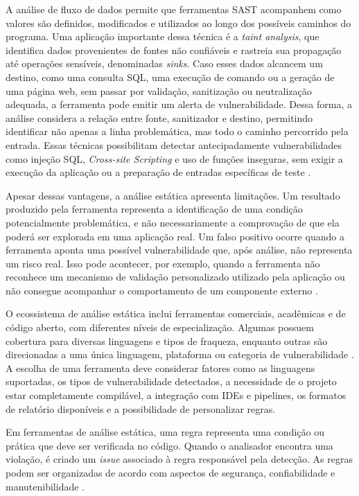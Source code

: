 A análise de fluxo de dados permite que ferramentas SAST acompanhem como valores são definidos, modificados e utilizados ao longo dos possíveis caminhos do programa. Uma aplicação importante dessa técnica é a \textit{taint analysis}, que identifica dados provenientes de fontes não confiáveis e rastreia sua propagação até operações sensíveis, denominadas \textit{sinks}. Caso esses dados alcancem um destino, como uma consulta SQL, uma execução de comando ou a geração de uma página web, sem passar por validação, sanitização ou neutralização adequada, a ferramenta pode emitir um alerta de vulnerabilidade. Dessa forma, a análise considera a relação entre fonte, sanitizador e destino, permitindo identificar não apenas a linha problemática, mas todo o caminho percorrido pela entrada. Essas técnicas possibilitam detectar antecipadamente vulnerabilidades como injeção SQL, \textit{Cross-site Scripting} e uso de funções inseguras, sem exigir a execução da aplicação ou a preparação de entradas específicas de teste \cite{noauthor_static_nodate}.

Apesar dessas vantagens, a análise estática apresenta limitações. Um resultado produzido pela ferramenta representa a identificação de uma condição potencialmente problemática, e não necessariamente a comprovação de que ela poderá ser explorada em uma aplicação real. Um falso positivo ocorre quando a ferramenta aponta uma possível vulnerabilidade que, após análise, não representa um risco real. Isso pode acontecer, por exemplo, quando a ferramenta não reconhece um mecanismo de validação personalizado utilizado pela aplicação ou não consegue acompanhar o comportamento de um componente externo \cite{iranmanesh_zerofalse_2025}.

O ecossistema de análise estática inclui ferramentas comerciais, acadêmicas e de código aberto, com diferentes níveis de especialização. Algumas possuem cobertura para diversas linguagens e tipos de fraqueza, enquanto outras são direcionadas a uma única linguagem, plataforma ou categoria de vulnerabilidade \cite{nist_source_code_security_analyzers_2021}. A escolha de uma ferramenta deve considerar fatores como as linguagens suportadas, os tipos de vulnerabilidade detectados, a necessidade de o projeto estar completamente compilável, a integração com IDEs e pipelines, os formatos de relatório disponíveis e a possibilidade de personalizar regras.

Em ferramentas de análise estática, uma regra representa uma condição ou prática que deve ser verificada no código. Quando o analisador encontra uma violação, é criado um \textit{issue} associado à regra responsável pela detecção. As regras podem ser organizadas de acordo com aspectos de segurança, confiabilidade e manutenibilidade \cite{noauthor_sonarqube_2026}.


